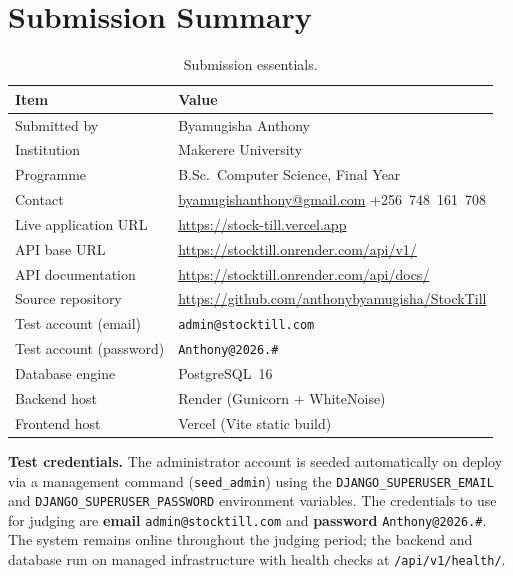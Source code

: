 \documentclass[11pt,a4paper]{article}
\begin{document}
\section{Submission Summary}
\label{sec:submission}

\begin{table}[htbp]\centering
\small
\caption{Submission essentials.}
\begin{tabular}{@{}p{}p{}@{}}
\toprule
\textbf{Item} & \textbf{Value} \\
\midrule
Submitted by & Byamugisha Anthony \\
Institution & Makerere University \\
Programme & B.Sc.\ Computer Science, Final Year \\
Contact & \href{mailto:byamugishanthony@gmail.com}{byamugishanthony@gmail.com}\quad
+256~748~161~708 \\
\midrule
Live application URL & \url{https://stock-till.vercel.app} \\
API base URL & \url{https://stocktill.onrender.com/api/v1/} \\
API documentation & \url{https://stocktill.onrender.com/api/docs/} \\
Source repository & \url{https://github.com/anthonybyamugisha/StockTill} \\
Test account (email) & \texttt{admin@stocktill.com} \\
Test account (password) & \texttt{Anthony@2026.\#} \\
Database engine & PostgreSQL~16 \\
Backend host & Render (Gunicorn + WhiteNoise) \\
Frontend host & Vercel (Vite static build) \\
\bottomrule
\end{tabular}
\end{table}

\noindent\textbf{Test credentials.} The administrator account is seeded automatically on deploy
via a management command (\texttt{seed\_admin}) using the \texttt{DJANGO\_SUPERUSER\_EMAIL} and
\texttt{DJANGO\_SUPERUSER\_PASSWORD} environment variables. The credentials to use for judging are
\textbf{email} \texttt{admin@stocktill.com} and \textbf{password} \texttt{Anthony@2026.\#}. The
system remains online throughout the judging period; the backend and database run on managed
infrastructure with health checks at \texttt{/api/v1/health/}.
\end{document}
